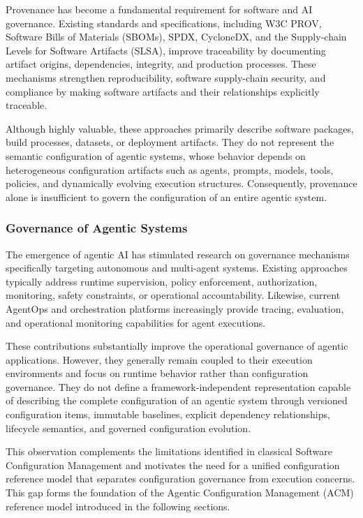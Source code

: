 \documentclass[10pt]{article}
\begin{document}
Provenance has become a fundamental requirement for software and AI governance. Existing standards and specifications, including W3C PROV, Software Bills of Materials (SBOMs), SPDX, CycloneDX, and the Supply-chain Levels for Software Artifacts (SLSA), improve traceability by documenting artifact origins, dependencies, integrity, and production processes. These mechanisms strengthen reproducibility, software supply-chain security, and compliance by making software artifacts and their relationships explicitly traceable.

Although highly valuable, these approaches primarily describe software packages, build processes, datasets, or deployment artifacts. They do not represent the semantic configuration of agentic systems, whose behavior depends on heterogeneous configuration artifacts such as agents, prompts, models, tools, policies, and dynamically evolving execution structures. Consequently, provenance alone is insufficient to govern the configuration of an entire agentic system.

\subsubsection{Governance of Agentic Systems}
\label{sec:agentic_governance}

The emergence of agentic AI has stimulated research on governance mechanisms specifically targeting autonomous and multi-agent systems. Existing approaches typically address runtime supervision, policy enforcement, authorization, monitoring, safety constraints, or operational accountability. Likewise, current AgentOps and orchestration platforms increasingly provide tracing, evaluation, and operational monitoring capabilities for agent executions.

These contributions substantially improve the operational governance of agentic applications. However, they generally remain coupled to their execution environments and focus on runtime behavior rather than configuration governance. They do not define a framework-independent representation capable of describing the complete configuration of an agentic system through versioned configuration items, immutable baselines, explicit dependency relationships, lifecycle semantics, and governed configuration evolution.

This observation complements the limitations identified in classical Software Configuration Management and motivates the need for a unified configuration reference model that separates configuration governance from execution concerns. This gap forms the foundation of the Agentic Configuration Management (ACM) reference model introduced in the following sections.
\end{document}
